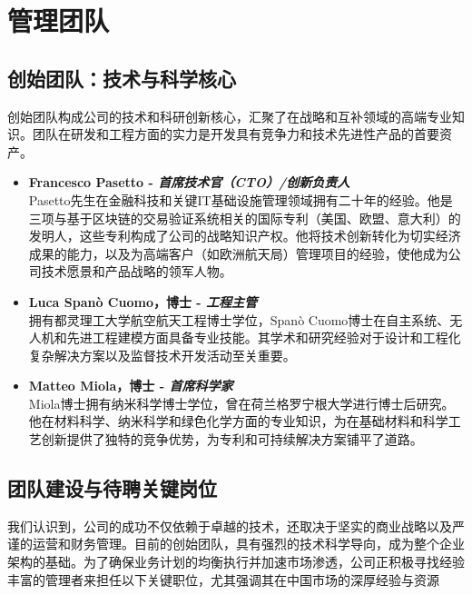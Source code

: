 \documentclass[11点, A4纸, 单面]{article}
\begin{document}
\newpage
\section{管理团队}

\subsection{创始团队：技术与科学核心}

创始团队构成公司的技术和科研创新核心，汇聚了在战略和互补领域的高端专业知识。团队在研发和工程方面的实力是开发具有竞争力和技术先进性产品的首要资产。

\begin{itemize}
    \item \textbf{Francesco Pasetto - \textit{首席技术官（CTO）/创新负责人}} \\
    Pasetto先生在金融科技和关键IT基础设施管理领域拥有二十年的经验。他是三项与基于区块链的交易验证系统相关的国际专利（美国、欧盟、意大利）的发明人，这些专利构成了公司的战略知识产权。他将技术创新转化为切实经济成果的能力，以及为高端客户（如欧洲航天局）管理项目的经验，使他成为公司技术愿景和产品战略的领军人物。

    \item \textbf{Luca Spanò Cuomo，博士 - \textit{工程主管}} \\
    拥有都灵理工大学航空航天工程博士学位，Spanò Cuomo博士在自主系统、无人机和先进工程建模方面具备专业技能。其学术和研究经验对于设计和工程化复杂解决方案以及监督技术开发活动至关重要。

    \item \textbf{Matteo Miola，博士 - \textit{首席科学家}} \\
    Miola博士拥有纳米科学博士学位，曾在荷兰格罗宁根大学进行博士后研究。他在材料科学、纳米科学和绿色化学方面的专业知识，为在基础材料和科学工艺创新提供了独特的竞争优势，为专利和可持续解决方案铺平了道路。
\end{itemize}



\subsection{团队建设与待聘关键岗位}

我们认识到，公司的成功不仅依赖于卓越的技术，还取决于坚实的商业战略以及严谨的运营和财务管理。目前的创始团队，具有强烈的技术科学导向，成为整个企业架构的基础。为了确保业务计划的均衡执行并加速市场渗透，公司正积极寻找经验丰富的管理者来担任以下关键职位，尤其强调其在中国市场的深厚经验与资源
\end{document}
